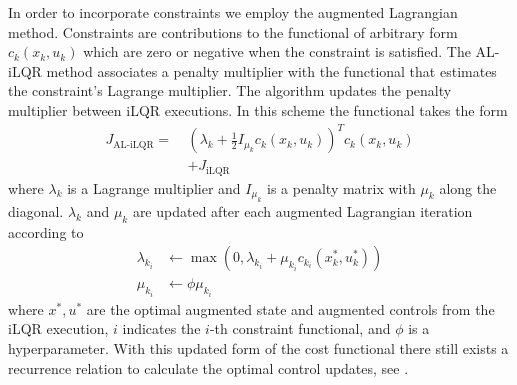 \documentclass[
  amsfonts,
  amsmath,
  tbtags,
  amssymb,
  aps,
  nobibnotes,
  twocolumn,
  superscriptaddress,
]{revtex4-2}
\begin{document}
In order to incorporate constraints we employ
the augmented Lagrangian method. Constraints are contributions
to the functional of arbitrary form $c_{k}(x_{k}, u_{k})$ which are
zero or negative when the constraint is satisfied. The AL-iLQR
method associates a penalty multiplier with the functional
that estimates the constraint's Lagrange multiplier.
The algorithm updates the penalty multiplier between
iLQR executions. In this scheme the functional takes the form
\begin{equation}
  \begin{aligned}
    J_{\textrm{AL-iLQR}} = \ &(\lambda_{k} + \frac{1}{2}I_{\mu_{k}} c_{k}(x_{k}, u_{k}))^{T} c_{k}(x_{k}, u_{k})\\
    &+ J_{\textrm{iLQR}}
  \end{aligned}
\end{equation}
where $\lambda_{k}$ is a Lagrange multiplier and $I_{\mu_{k}}$ is a penalty matrix
with $\mu_{k}$ along the diagonal.
$\lambda_{k}$ and $\mu_{k}$ are updated after each augmented Lagrangian iteration according to
\begin{align}
  \lambda_{k_{i}} &\gets \max(0, \lambda_{k_{i}} + \mu_{k_{i}} c_{k_{i}}(x_{k}^{*}, u_{k}^{*}))\\
  \mu_{k_{i}} &\gets \phi \mu_{k_{i}}
\end{align}
where $x^{*}, u^{*}$ are the optimal augmented state and augmented controls from the iLQR execution,
$i$ indicates the $i$-th constraint functional,
and $\phi$ is a hyperparameter. With this updated form of the cost
functional there still exists a recurrence relation to calculate the optimal control
updates, see \cite{howell2019altro}.


\end{document}
